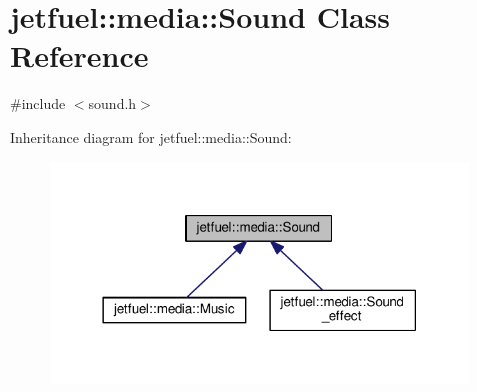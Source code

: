 \hypertarget{classjetfuel_1_1media_1_1Sound}{}\section{jetfuel\+:\+:media\+:\+:Sound Class Reference}
\label{classjetfuel_1_1media_1_1Sound}


{\ttfamily \#include $<$sound.\+h$>$}



Inheritance diagram for jetfuel\+:\+:media\+:\+:Sound\+:\nopagebreak
\begin{figure}[H]
\begin{center}
\leavevmode
\includegraphics[width=314pt]{classjetfuel_1_1media_1_1Sound__inherit__graph}
\end{center}
\end{figure}
